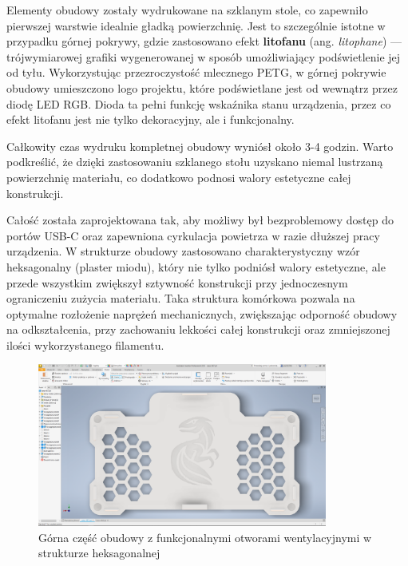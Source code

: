 Elementy obudowy zostały wydrukowane na szklanym stole, co zapewniło pierwszej warstwie idealnie gładką powierzchnię. Jest to szczególnie istotne w przypadku górnej pokrywy, gdzie zastosowano efekt \textbf{litofanu} (ang. \textit{litophane}) — trójwymiarowej grafiki wygenerowanej w sposób umożliwiający podświetlenie jej od tyłu. Wykorzystując przezroczystość mlecznego PETG, w górnej pokrywie obudowy umieszczono logo projektu, które podświetlane jest od wewnątrz przez diodę LED RGB. Dioda ta pełni funkcję wskaźnika stanu urządzenia, przez co efekt litofanu jest nie tylko dekoracyjny, ale i funkcjonalny.

Całkowity czas wydruku kompletnej obudowy wyniósł około 3-4 godzin. Warto podkreślić, że dzięki zastosowaniu szklanego stołu uzyskano niemal lustrzaną powierzchnię materiału, co dodatkowo podnosi walory estetyczne całej konstrukcji.

\clearpage
Całość została zaprojektowana tak, aby możliwy był bezproblemowy dostęp do portów USB-C oraz zapewniona cyrkulacja powietrza w razie dłuższej pracy urządzenia. W strukturze obudowy zastosowano charakterystyczny wzór heksagonalny (plaster miodu), który nie tylko podniósł walory estetyczne, ale przede wszystkim zwiększył sztywność konstrukcji przy jednoczesnym ograniczeniu zużycia materiału. Taka struktura komórkowa pozwala na optymalne rozłożenie naprężeń mechanicznych, zwiększając odporność obudowy na odkształcenia, przy zachowaniu lekkości całej konstrukcji oraz zmniejszonej ilości wykorzystanego filamentu.

\vspace{1cm}

\begin{figure}[htbp]
\centering
	\includegraphics[width=0.85\textwidth]{root/cover_back.png}
	\caption{Górna część obudowy z funkcjonalnymi otworami wentylacyjnymi w strukturze heksagonalnej}
\end{figure}

